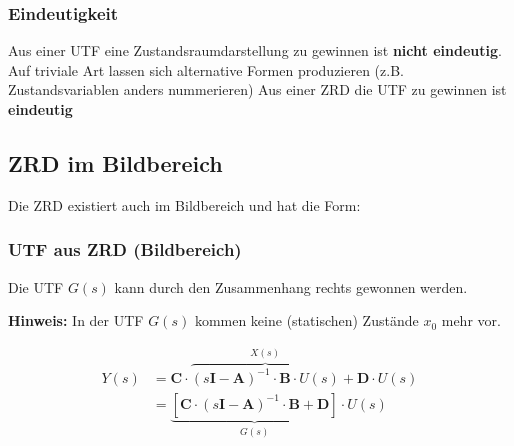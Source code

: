 \subsubsection{Eindeutigkeit}

\begin{outline}
    \1 Aus einer UTF eine Zustandsraumdarstellung zu gewinnen ist \textbf{nicht eindeutig}. Auf triviale Art lassen sich alternative Formen
        produzieren (z.B. Zustandsvariablen anders nummerieren)
    \1 Aus einer ZRD die UTF zu gewinnen ist \textbf{eindeutig}
\end{outline}


\subsection{ZRD im Bildbereich}



\begin{minipage}[c]{0.5\columnwidth}
    Die ZRD existiert auch im Bildbereich und hat die Form:
\end{minipage}
\hfill
\begin{minipage}[c]{0.45\columnwidth}
\end{minipage}


\subsubsection{UTF aus ZRD (Bildbereich)}

\vspace{-0.3cm}

\begin{minipage}[c]{0.44\columnwidth}
    Die UTF $G(s)$ kann durch den Zusammenhang rechts gewonnen werden.

    \smallskip

    \textbf{Hinweis:} In der UTF $G(s)$ kommen keine (statischen) Zustände $x_0$ mehr vor.
\end{minipage}
\hfill
\begin{minipage}[c]{0.52\columnwidth}
    \begin{align*}
        Y(s)    &= \bm{C} \cdot \overbrace{(s \bm{I} - \bm{A})^{-1} \cdot \bm{B} \cdot U(s)}^{X(s)} + \bm{D} \cdot U(s)  \\
                &= \underbrace{\left[ \bm{C} \cdot (s \bm{I} - \bm{A})^{-1} \cdot \bm{B} + \bm{D} \right]}_{G(s)} \cdot U(s)
    \end{align*}
\end{minipage}


